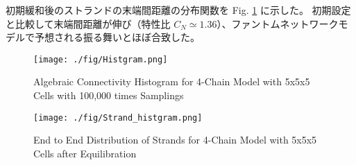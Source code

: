 \documentclass[11pt]{jsarticle}
\begin{document}
初期緩和後のストランドの末端間距離の分布関数を Fig. \ref{fig:e2e} に示した。
初期設定と比較して末端間距離が伸び（特性比 $C_N \simeq 1.36$）、ファントムネットワークモデルで予想される振る舞いとほぼ合致した。



\vspace{-1mm}
\begin{figure}[hb]
\begin{minipage}{0.5\hsize}
	\begin{center}
	\texttt{[image: ./fig/Histgram.png]}
	\caption{Algebraic Connectivity Histogram for 4-Chain Model with 5x5x5 Cells with 100,000 times Samplings}
	\label{fig:alg}
	\end{center}
\end{minipage}
\begin{minipage}{0.5\hsize}
	\begin{center}
	\texttt{[image: ./fig/Strand\_histgram.png]}
	\caption{End to End Distribution of Strands for 4-Chain Model with 5x5x5 Cells after Equilibration }
	\label{fig:e2e}
	\end{center}
\end{minipage}
\end{figure}

\vspace{-3mm}



\end{document}
